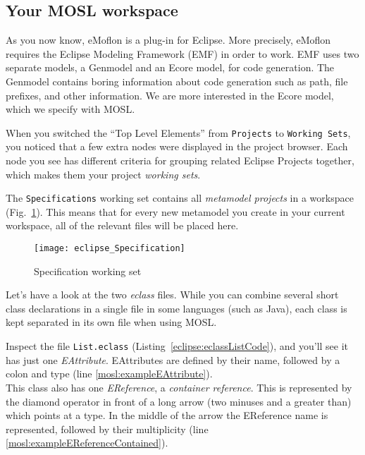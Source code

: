 \newpage
\texHeader
\hypertarget{projectStructure tex}{}
\subsection{Your MOSL workspace}

As you now know, eMoflon is a plug-in for Eclipse. More precisely, eMoflon requires the Eclipse Modeling Framework (EMF) in order to work. EMF uses two separate
models, a Genmodel and an Ecore model, for code generation. The Genmodel contains boring information about code generation such as path, file prefixes, and
other information. We are more interested in the Ecore model, which we specify with MOSL.

When you switched the ``Top Level Elements'' from \texttt{Projects} to \texttt{Working Sets}, you noticed that a few extra nodes were displayed in the project
browser. Each node you see has different criteria for grouping related Eclipse Projects together, which makes them your project \emph{working sets}.

The \texttt{Specifications} working set contains all \emph{metamodel projects} in a workspace (Fig.~\ref{eclipse:modelSpecification}). This means that for every
new metamodel you create in your current workspace, all of the relevant files will be placed here.

 \begin{figure}[htbp]
  \centering
  \texttt{[image: eclipse\_Specification]}
  \caption{Specification working set}
  \label{eclipse:modelSpecification}
\end{figure}
  
Let's have a look at the two \emph{eclass} files. While you can combine several short class declarations in a single file in some languages (such as Java), each class is kept separated in its own file when using MOSL.

Inspect the file \texttt{List.eclass} (Listing~\ref{eclipse:eclassListCode}), and you'll see it has just one \emph{EAttribute}. EAttributes are defined by their name, followed by a colon and type (line \ref{mosl:exampleEAttribute}). \\
This class also has one \emph{EReference}, a \emph{container reference}. This is represented by the diamond operator in front of a long arrow (two minuses and a greater than) which points at a type. In the middle of the arrow the EReference name is represented, followed by their multiplicity (line \ref{mosl:exampleEReferenceContained}). \\[8mm]


